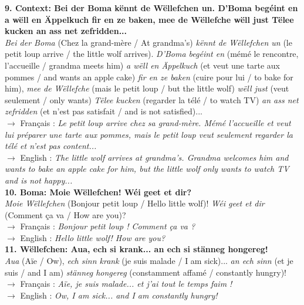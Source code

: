 \noindent\textbf{9. Context: Bei der Boma kënnt de Wëllefchen un. D'Boma begéint en a wëll en Äppelkuch fir en ze baken, mee de Wëllefche wëll just Tëlee kucken an ass net zefridden...}\\
\textit{Bei der Boma} (Chez la grand-mère / At grandma's) \textit{kënnt de Wëllefchen un} (le petit loup arrive / the little wolf arrives). \textit{D'Boma begéint en} (mémé le rencontre, l'accueille / grandma meets him) \textit{a wëll en Äppelkuch} (et veut une tarte aux pommes / and wants an apple cake) \textit{fir en ze baken} (cuire pour lui / to bake for him), \textit{mee de Wëllefche} (mais le petit loup / but the little wolf) \textit{wëll just} (veut seulement / only wants) \textit{Tëlee kucken} (regarder la télé / to watch TV) \textit{an ass net zefridden} (et n'est pas satisfait / and is not satisfied)...\\
$\rightarrow$ Français : \textit{Le petit loup arrive chez sa grand-mère. Mémé l'accueille et veut lui préparer une tarte aux pommes, mais le petit loup veut seulement regarder la télé et n'est pas content...}\\
$\rightarrow$ English : \textit{The little wolf arrives at grandma's. Grandma welcomes him and wants to bake an apple cake for him, but the little wolf only wants to watch TV and is not happy...}\\[0.5em]

\noindent\textbf{10. Boma: Moie Wëllefchen! Wéi geet et dir?}\\
\textit{Moie Wëllefchen} (Bonjour petit loup / Hello little wolf)! \textit{Wéi geet et dir} (Comment ça va / How are you)?\\
$\rightarrow$ Français : \textit{Bonjour petit loup ! Comment ça va ?}\\
$\rightarrow$ English : \textit{Hello little wolf! How are you?}\\[0.5em]

\noindent\textbf{11. Wëllefchen: Aua, ech si krank... an ech si stänneg hongereg!}\\
\textit{Aua} (Aïe / Ow), \textit{ech sinn krank} (je suis malade / I am sick)... \textit{an ech sinn} (et je suis / and I am) \textit{stänneg hongereg} (constamment affamé / constantly hungry)!\\
$\rightarrow$ Français : \textit{Aïe, je suis malade... et j'ai tout le temps faim !}\\
$\rightarrow$ English : \textit{Ow, I am sick... and I am constantly hungry!}\\[0.5em]

